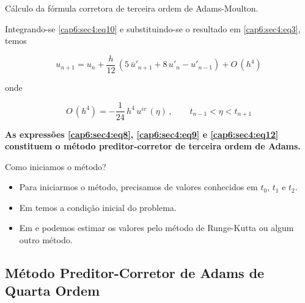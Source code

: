 \begin{enumerar}
\item Cálculo da fórmula corretora de terceira ordem de Adams-Moulton.

Integrando-se \ref{cap6:sec4:eq10} e substituindo-se o resultado em \ref{cap6:sec4:eq3}, temos

\begin{equation}
 \label{cap6:sec4:eq12}
 u_{n+1} = u_n + \frac{h}{12} \, (5 \, \bar{u}'_{n+1} + 8 \, u'_n - u'_{n-1}) + O \, (h^4)
\end{equation}

onde

\begin{equation}
 \label{cap6:sec4:eq13}
 O \, (h^4) = - \frac{1}{24} \, h^4 \, u^{iv} \, (\eta) \, , \qquad t_{n-1} < \eta < t_{n+1}
\end{equation}

\textbf{As expressões \ref{cap6:sec4:eq8}, \ref{cap6:sec4:eq9} e \ref{cap6:sec4:eq12} constituem o método preditor-corretor de terceira ordem de Adams.}

\item Como iniciamos o método?

\begin{itemize}

\item Para iniciarmos o método, precisamos de valores conhecidos em $t_0$, $t_1$ e $t_2$.

\item Em  temos a condição inicial do problema.

\item Em  e  podemos estimar os valores pelo método de Runge-Kutta ou algum outro método.

\end{itemize}

\end{enumerar}

\subsection{Método Preditor-Corretor de Adams de Quarta Ordem}

